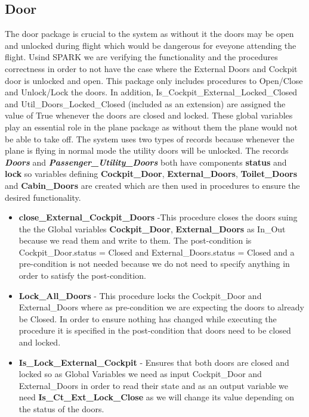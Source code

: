 \documentclass{llncs}
\begin{document}
\subsection{Door}
The door package is crucial to the system as without it the doors may be open and unlocked during flight which would be dangerous for eveyone attending the flight. Usind SPARK we are verifying the functionality and the procedures correctness in order to not have the case where the External Doors and Cockpit door is unlocked and open. 
This package only includes procedures to Open/Close and Unlock/Lock the doors. In addition, Is\_Cockpit\_External\_Locked\_Closed and Util\_Doors\_Locked\_Closed (included as an extension) are assigned the value of True whenever the doors are closed and locked. These global variables play an essential role in the plane package as without them the plane would not be able to take off. The system uses two types of records because whenever the plane is flying in normal mode the utility doors will be unlocked.
The records {\textbf{\textit{Doors}}} and {\textbf{\textit{Passenger\_Utility\_Doors}}} both have components {\textbf{status}} and {\textbf{lock}} so variables defining {\textbf{Cockpit\_Door}}, {\textbf{External\_Doors}}, {\textbf{Toilet\_Doors}} and {\textbf{Cabin\_Doors}} are created which are then used in procedures to ensure the desired functionality.  
\begin{itemize}
\item \textbf{close\_External\_Cockpit\_Doors} -This procedure closes the doors  suing the the Global variables {\textbf{Cockpit\_Door}, \textbf{External\_Doors}} as In\_Out because we read them and write to them. The post-condition is Cockpit\_Door.status = Closed and External\_Doors.status = Closed and a pre-condition is not needed because we do not need to specify anything in order to satisfy the post-condition. 
\item \textbf{Lock\_All\_Doors} - This procedure locks  the Cockpit\_Door and  External\_Doors where as pre-condition we are expecting the doors to already be Closed. In order to ensure nothing has changed while executing the procedure it is specified in the post-condition that doors need to be closed and locked. 
\item \textbf{Is\_Lock\_External\_Cockpit} -  Ensures that both doors are closed and locked so as Global Variables we need as input Cockpit\_Door and External\_Doors in order to read their state and as an output variable we need {\textbf{Is\_Ct\_Ext\_Lock\_Close}} as we will change its value depending on the status of the doors. 
\end{itemize}
\end{document}
